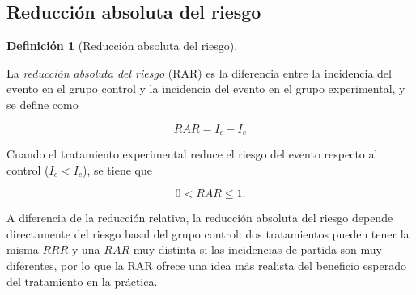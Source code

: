 \documentclass[
  spanish,
  a4paper,
]{scrreport}
\theoremstyle{definition}
\theoremstyle{definition}
\newtheorem{definition}{Definición}[chapter]
\theoremstyle{remark}
\begin{document}
\subsection{Reducción absoluta del
riesgo}\label{reducciuxf3n-absoluta-del-riesgo}

\begin{definition}[Reducción absoluta del
riesgo]\protect\hypertarget{def-experimentales-rar}{}\label{def-experimentales-rar}

La \emph{reducción absoluta del riesgo} (RAR) es la diferencia entre la
incidencia del evento en el grupo control y la incidencia del evento en
el grupo experimental, y se define como

\[RAR = I_c - I_e\]

\end{definition}

\begin{tcolorbox}[enhanced jigsaw, arc=.35mm, bottomrule=.15mm, bottomtitle=1mm, breakable, colback=white, colbacktitle=quarto-callout-important-color!10!white, colframe=quarto-callout-important-color-frame, coltitle=black, left=2mm, leftrule=.75mm, opacityback=0, opacitybacktitle=0.6, rightrule=.15mm, title=\textcolor{quarto-callout-important-color}{\faExclamation}\hspace{0.5em}{Importante}, titlerule=0mm, toprule=.15mm, toptitle=1mm]

Cuando el tratamiento experimental reduce el riesgo del evento respecto
al control (\(I_e < I_c\)), se tiene que

\[0 < RAR \leq 1.\]

\end{tcolorbox}

\begin{tcolorbox}[enhanced jigsaw, arc=.35mm, bottomrule=.15mm, bottomtitle=1mm, breakable, colback=white, colbacktitle=quarto-callout-note-color!10!white, colframe=quarto-callout-note-color-frame, coltitle=black, left=2mm, leftrule=.75mm, opacityback=0, opacitybacktitle=0.6, rightrule=.15mm, title=\textcolor{quarto-callout-note-color}{\faInfo}\hspace{0.5em}{Interpretación}, titlerule=0mm, toprule=.15mm, toptitle=1mm]

A diferencia de la reducción relativa, la reducción absoluta del riesgo
depende directamente del riesgo basal del grupo control: dos
tratamientos pueden tener la misma \(RRR\) y una \(RAR\) muy distinta si
las incidencias de partida son muy diferentes, por lo que la RAR ofrece
una idea más realista del beneficio esperado del tratamiento en la
práctica.

\end{tcolorbox}
\end{document}
